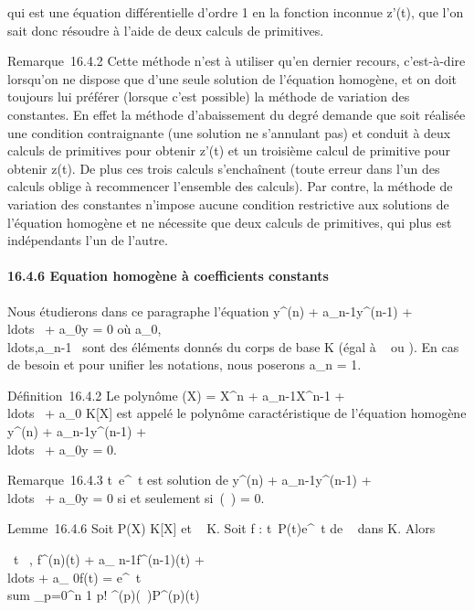 \documentclass[]{article}
\begin{document}
qui est une équation différentielle d'ordre 1 en la fonction inconnue
z'(t), que l'on sait donc résoudre à l'aide de deux calculs de
primitives.

Remarque~16.4.2 Cette méthode n'est à utiliser qu'en dernier recours,
c'est-à-dire lorsqu'on ne dispose que d'une seule solution de l'équation
homogène, et on doit toujours lui préférer (lorsque c'est possible) la
méthode de variation des constantes. En effet la méthode d'abaissement
du degré demande que soit réalisée une condition contraignante (une
solution ne s'annulant pas) et conduit à deux calculs de primitives pour
obtenir z'(t) et un troisième calcul de primitive pour obtenir z(t). De
plus ces trois calculs s'enchaînent (toute erreur dans l'un des calculs
oblige à recommencer l'ensemble des calculs). Par contre, la méthode de
variation des constantes n'impose aucune condition restrictive aux
solutions de l'équation homogène et ne nécessite que deux calculs de
primitives, qui plus est indépendants l'un de l'autre.

\paragraph{16.4.6 Equation homogène à coefficients constants}

Nous étudierons dans ce paragraphe l'équation y^(n) +
a_n-1y^(n-1) +
\\ldots~ +
a_0y = 0 où
a_0,\\ldots,a_n-1~
sont des éléments donnés du corps de base K (égal à ~ ou ). En cas de
besoin et pour unifier les notations, nous poserons a_n = 1.

Définition~16.4.2 Le polynôme \chi(X) = X^n +
a_n-1X^n-1 +
\\ldots~ +
a_0 \in K[X] est appelé le polynôme caractéristique de
l'équation homogène y^(n) + a_n-1y^(n-1)
+ \\ldots~ +
a_0y = 0.

Remarque~16.4.3 t\mapsto~e^\lambda~t est
solution de y^(n) + a_n-1y^(n-1) +
\\ldots~ +
a_0y = 0 si et seulement si~\chi(\lambda~) = 0.

Lemme~16.4.6 Soit P(X) \in K[X] et \lambda~ \in K. Soit f :
t\mapsto~P(t)e^\lambda~t de ~ dans K. Alors

\forall~t \in {}~, f^(n)(t) + a_
n-1f^(n-1)(t) +
\\ldots + a_
0f(t) = e^\lambda~t \\sum
_p=0^n 1 \over p!
\chi^(p)(\lambda~)P^(p)(t)
\end{document}
